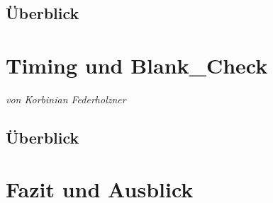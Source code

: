 \documentclass[12pt,a4paper,bibliography=totoc,listof=totoc]{scrartcl}
\begin{document}
\subsection{Überblick}


\pagebreak
\section{Timing und Blank\_Check}
\textit{von Korbinian Federholzner}
\subsection{Überblick}

\subsection{}


\pagebreak
\section{Fazit und Ausblick}



\pagebreak




\end{document}

